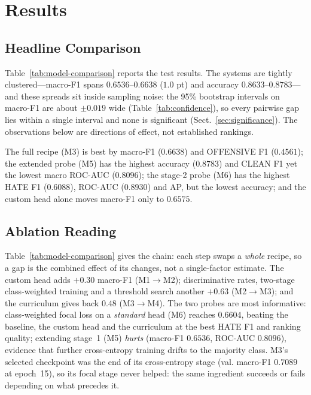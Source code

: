 \section{Results}
\label{sec:results}

\subsection{Headline Comparison}
Table~\ref{tab:model-comparison} reports the test results.  The systems are
tightly clustered---macro-F1 spans $0.6536$--$0.6638$ ($1.0$ pt) and accuracy
$0.8633$--$0.8783$---and these spreads sit inside sampling noise: the 95\% bootstrap
intervals on macro-F1 are about $\pm0.019$ wide (Table~\ref{tab:confidence}), so
every pairwise gap lies within a single interval and none is significant
(Sect.~\ref{sec:significance}).  The observations below are directions of effect,
not established rankings.



The full recipe (M3) is best by macro-F1 ($\mathbf{0.6638}$) and OFFENSIVE F1
($0.4561$); the extended probe (M5) has the highest accuracy ($\mathbf{0.8783}$)
and CLEAN F1 yet the lowest macro ROC-AUC ($0.8096$); the stage-2 probe (M6) has
the highest HATE F1 ($\mathbf{0.6088}$), ROC-AUC ($\mathbf{0.8930}$) and AP, but
the lowest accuracy; and the custom head alone moves macro-F1 only to $0.6575$.

\subsection{Ablation Reading}
Table~\ref{tab:model-comparison} gives the chain: each step swaps a \emph{whole}
recipe, so a gap is the combined effect of its changes, not a single-factor
estimate.  The custom head adds $+0.30$ macro-F1 (M1$\to$M2); discriminative rates,
two-stage class-weighted training and a threshold search another $+0.63$
(M2$\to$M3); and the curriculum gives back $0.48$ (M3$\to$M4).  The two probes are
most informative: class-weighted focal loss on a \emph{standard} head (M6) reaches
$0.6604$, beating the baseline, the custom head and the curriculum at the best HATE
F1 and ranking quality; extending stage~1 (M5) \emph{hurts} (macro-F1 $0.6536$,
ROC-AUC $0.8096$), evidence that further cross-entropy training drifts to the
majority class.  M3's selected checkpoint was the end of its cross-entropy stage
(val. macro-F1 $0.7089$ at epoch~15), so its focal stage never helped: the same
ingredient succeeds or fails depending on what precedes it.

